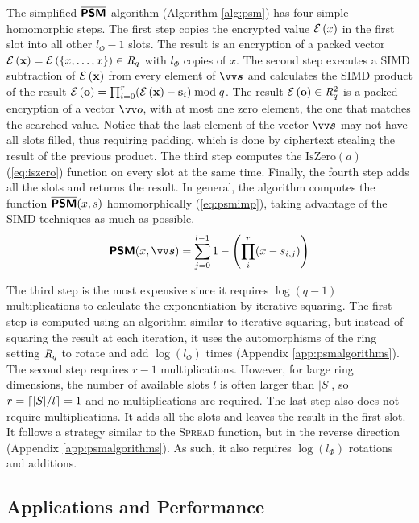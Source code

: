 The simplified $\overline{\textsf{\textbf{PSM}}}$ algorithm (Algorithm \ref{alg:psm}) has four simple homomorphic steps. The first step copies the encrypted value $\mathcal{E}\left({x}\right)$ in the first slot into all other $l_{\Phi}-1$ slots. The result is an encryption of a packed vector $\mathcal{E}\left({\mathbf{x}}\right) = \mathcal{E}\left({\{x,\dots,x\}}\right) \in \mathit{R}_q$ with $l_{\Phi}$ copies of $x$. The second step executes a \ac{SIMD} subtraction of $\mathcal{E}\left({\mathbf{x}}\right)$ from every element of $\pv{s}$ and calculates the \ac{SIMD} product of the result $\mathcal{E}\left({\mathbf{o}}\right) = \prod_{i=0}^r (\mathcal{E}\left({\mathbf{x}}\right)-\mathbf{s}_i) \bmod q$. The result $\mathcal{E}\left({\mathbf{o}}\right) \in \mathit{R}_q^2$ is a packed encryption of a vector $\vo$, with at most one zero element, the one that matches the searched value. Notice that the last element of the vector $\pv{s}$ may not have all slots filled, thus requiring padding, which is done by ciphertext stealing the result of the previous product. The third step computes the $\mathrm{IsZero}(a)$ (\cref{eq:iszero}) function on every slot at the same time. Finally, the fourth step adds all the slots and returns the result. In general, the algorithm computes the function $\overline{\textsf{\textbf{PSM}}}(x,s)$ homomorphically (\cref{eq:psmimp}),
taking advantage of the \ac{SIMD} techniques as much as possible.
\begin{equation}\label{eq:psmimp}
    \PSM(x,\pv{s}) =\sum_{j=0}^{l-1} 1-\left(\prod_i^r (x-s_{i,j})\right)
\end{equation}

The third step is the most expensive since it requires $\log(q-1)$ multiplications to calculate the exponentiation by iterative squaring. The first step is computed using an algorithm similar to iterative squaring, but instead of squaring the result at each iteration, it uses the automorphisms of the ring setting $\mathit{R}_q$ to rotate and add $\log(l_{\Phi})$ times (Appendix \ref{app:psmalgorithms}). The second step requires $r-1$ multiplications. However, for large ring dimensions, the number of available slots $l$ is often larger than $|S|$, so $r=\left\lceil |S|/l \right\rceil=1$ and no multiplications are required. The last step also does not require multiplications. It adds all the slots and leaves the result in the first slot. It follows a strategy similar to the \textsc{Spread} function, but in the reverse direction (Appendix \ref{app:psmalgorithms}). As such, it also requires $\log(l_{\Phi})$ rotations and additions.


\subsection{Applications and Performance}

